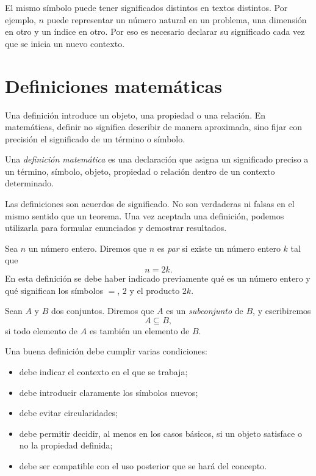\begin{advertencia}
El mismo símbolo puede tener significados distintos en textos distintos. Por ejemplo, \(n\) puede representar un número natural en un problema, una dimensión en otro y un índice en otro. Por eso es necesario declarar su significado cada vez que se inicia un nuevo contexto.
\end{advertencia}

\section{Definiciones matemáticas}
\label{sec:definiciones-matematicas}

Una definición introduce un objeto, una propiedad o una relación. En matemáticas, definir no significa describir de manera aproximada, sino fijar con precisión el significado de un término o símbolo.

\begin{definicion}
Una \emph{definición matemática} es una declaración que asigna un significado preciso a un término, símbolo, objeto, propiedad o relación dentro de un contexto determinado.
\end{definicion}

Las definiciones son acuerdos de significado. No son verdaderas ni falsas en el mismo sentido que un teorema. Una vez aceptada una definición, podemos utilizarla para formular enunciados y demostrar resultados.

\begin{ejemplo}
Sea \(n\) un número entero. Diremos que \(n\) es \emph{par} si existe un número entero \(k\) tal que
\[
  n = 2k.
\]
En esta definición se debe haber indicado previamente qué es un número entero y qué significan los símbolos \(=\), \(2\) y el producto \(2k\).
\end{ejemplo}

\begin{ejemplo}
Sean \(A\) y \(B\) dos conjuntos. Diremos que \(A\) es un \emph{subconjunto} de \(B\), y escribiremos
\[
  A\subseteq B,
\]
si todo elemento de \(A\) es también un elemento de \(B\).
\end{ejemplo}

Una buena definición debe cumplir varias condiciones:

\begin{itemize}
  \item debe indicar el contexto en el que se trabaja;
  \item debe introducir claramente los símbolos nuevos;
  \item debe evitar circularidades;
  \item debe permitir decidir, al menos en los casos básicos, si un objeto satisface o no la propiedad definida;
  \item debe ser compatible con el uso posterior que se hará del concepto.
\end{itemize}

